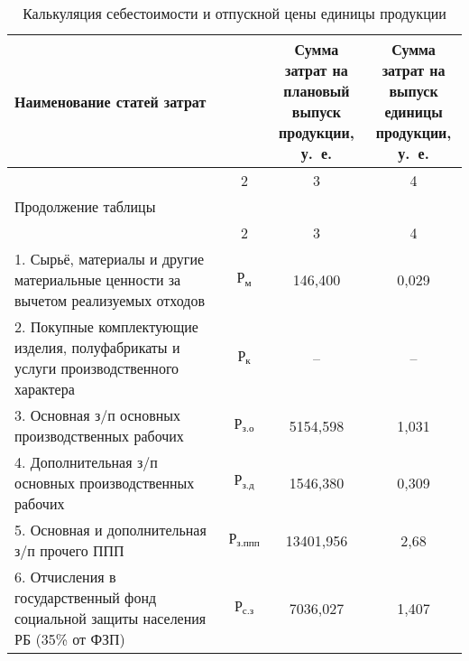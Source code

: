 {\small
\begin{longtable}{| m{10.7cm} | c | c | c |}
  \caption{
    Калькуляция себестоимости и отпускной цены единицы продукции
  }\label{tbl:calculation} \\
      \hline
      \centering Наименование статей затрат
      & \rotatebox[origin=c]{90}{\parbox{3.5cm}{Условное обозначение}}
      & \rotatebox[origin=c]{90}{
        \parbox{3.5cm}{
          Сумма затрат на \\ плановый выпуск \\ продукции, у.~е.
        }
      }
      & \rotatebox[origin=c]{90}{
        \parbox{3.5cm}{
          Сумма затрат на \\ выпуск единицы \\ продукции, у.~е.
        }
      } \\

      \hline
      \centering 1 & 2 & 3 & 4 \\
      \hline
      \endfirsthead 

      \multicolumn{4}{l}{\normalsize Продолжение таблицы \thetable{}} \\
      \hline
      \centering 1 & 2 & 3 & 4 \\
      \hline
      \endhead

      1. Сырьё, материалы и другие материальные ценности \newline
      за вычетом реализуемых отходов
      & \( \text{Р}_{\text{м}} \) & 146{,}400 & 0{,}029 \\
      \hline

      2. Покупные комплектующие изделия, полуфабрикаты и \newline
      услуги производственного характера
      & \( \text{Р}_{\text{к}} \) & -- & -- \\
      \hline

      3. Основная з/п основных производственных рабочих
      & \( \text{Р}_{\text{з.о}} \) & 5154{,}598 & 1{,}031 \\
      \hline

      4. Дополнительная з/п основных производственных \newline рабочих
      & \( \text{Р}_{\text{з.д}} \) & 1546{,}380 & 0{,}309 \\
      \hline

      5. Основная и дополнительная з/п прочего ППП
      & \( \text{Р}_{\text{з.ппп}} \) & 13401{,}956 & 2{,}68 \\
      \hline

      6. Отчисления в государственный фонд социальной \newline
      защиты населения РБ (35\% от ФЗП)
      & \( \text{Р}_{\text{с.з}} \) & 7036{,}027 & 1{,}407 \\
      \hline


\end{longtable}}
